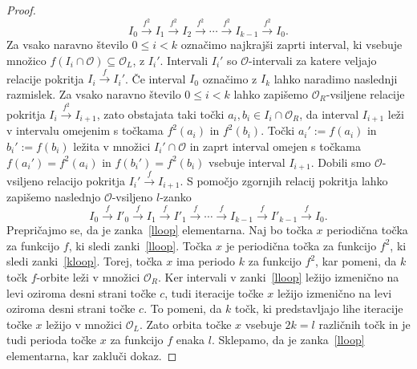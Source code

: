 \documentclass[../TG_magistrsko_delo_sections.tex]{subfiles}
\begin{document}
\begin{proof}
\begin{equation}\label{kloop}
I_0 \xrightarrow{f^2} I_1 \xrightarrow{f^2} I_2 \xrightarrow{f^2} \cdots \xrightarrow{f^2} I_{k-1} \xrightarrow{f^2} I_0.
\end{equation}
Za vsako naravno število $0 \leq i < k$ označimo najkrajši zaprti interval, ki vsebuje množico $f(I_i \cap \mathcal{O}) \subseteq \mathcal{O}_L$, z $I_i'$. Intervali $I_i'$ so $\mathcal{O}$-intervali za katere veljajo relacije pokritja $I_i \xrightarrow{f} I_i'$. Če interval $I_0$ označimo z $I_k$ lahko naradimo naslednji razmislek. Za vsako naravno število $0 \leq i < k$ lahko zapišemo $\mathcal{O}_R$-vsiljene relacije pokritja $I_i \xrightarrow{f^2} I_{i+1}$, zato obstajata taki točki $a_i, b_i \in I_i \cap \mathcal{O}_R$, da interval $I_{i+1}$ leži v intervalu omejenim s točkama $f^2(a_i)$ in $f^2(b_i)$. Točki $a_i' := f(a_i)$ in $b_i' := f(b_i)$ ležita v množici $I_i' \cap \mathcal{O}$ in zaprt interval omejen s točkama $f(a_i') = f^2(a_i)$ in $f(b_i') = f^2(b_i)$ vsebuje interval $I_{i+1}$. Dobili smo $\mathcal{O}$-vsiljeno relacijo pokritja $I_i' \xrightarrow{f} I_{i+1}$. S pomočjo zgornjih relacij pokritja lahko zapišemo naslednjo $\mathcal{O}$-vsiljeno $l$-zanko
\begin{equation}\label{lloop}
I_0 \xrightarrow{f} I'_0 \xrightarrow{f} I_1 \xrightarrow{f} I'_1 \xrightarrow{f} \cdots \xrightarrow{f} I_{k-1} \xrightarrow{f} I'_{k-1} \xrightarrow{f} I_0.
\end{equation}
Prepričajmo se, da je zanka~\eqref{lloop} elementarna. Naj bo točka $x$ periodična točka za funkcijo $f$, ki sledi zanki~\eqref{lloop}. Točka $x$ je periodična točka za funkcijo $f^2$, ki sledi zanki~\eqref{kloop}. Torej, točka $x$ ima periodo $k$ za funkcijo $f^2$, kar pomeni, da $k$ točk $f$-orbite leži v množici $\mathcal{O}_R$. Ker intervali v zanki~\eqref{lloop} ležijo izmenično na levi oziroma desni strani točke $c$, tudi iteracije točke $x$ ležijo izmenično na levi oziroma desni strani točke $c$. To pomeni, da $k$ točk, ki predstavljajo lihe iteracije točke $x$ ležijo v množici $\mathcal{O}_L$. Zato orbita točke $x$ vsebuje $2k = l$ različnih točk in je tudi perioda točke $x$ za funkcijo $f$ enaka $l$. Sklepamo, da je zanka~\eqref{lloop} elementarna, kar zakluči dokaz.
\end{proof}
\end{document}
